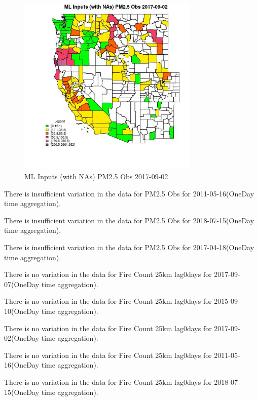 \begin{figure} 
\centering  
\includegraphics[width=0.77\textwidth]{Code_Outputs/Report_ML_input_PM25_Step4_part_e_de_duplicated_aves_compiled_2019-05-21wNAs_CountyPM25_ObsMean2017-09-02.jpg} 
\caption{\label{fig:Report_ML_input_PM25_Step4_part_e_de_duplicated_aves_compiled_2019-05-21wNAsCountyPM25_ObsMean2017-09-02}ML Inputs (with NAs) PM2.5 Obs 2017-09-02} 
\end{figure} 
 

There is insufficient variation in the data for PM2.5 Obs for 2011-05-16(OneDay time aggregation). 
 

There is insufficient variation in the data for PM2.5 Obs for 2018-07-15(OneDay time aggregation). 
 

There is insufficient variation in the data for PM2.5 Obs for 2017-04-18(OneDay time aggregation). 
 

There is no variation in the data for Fire Count 25km lag0days for 2017-09-07(OneDay time aggregation). 
 

There is no variation in the data for Fire Count 25km lag0days for 2015-09-10(OneDay time aggregation). 
 

There is no variation in the data for Fire Count 25km lag0days for 2017-09-02(OneDay time aggregation). 
 

There is no variation in the data for Fire Count 25km lag0days for 2011-05-16(OneDay time aggregation). 
 

There is no variation in the data for Fire Count 25km lag0days for 2018-07-15(OneDay time aggregation). 
 

